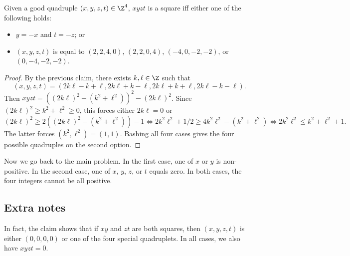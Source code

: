 \begin{claim}
Given a good quadruple $(x, y, z, t) \in \Z^4$, $xyzt$ is a square iff either one of the following holds:
\begin{itemize}
    \item   $y = -x$ and $t = -z$; or
    \item   $(x, y, z, t)$ is equal to $(2, 2, 4, 0)$, $(2, 2, 0, 4)$, $(-4, 0, -2, -2)$, or $(0, -4, -2, -2)$.
\end{itemize}
\end{claim}
\begin{proof}
By the previous claim, there exists $k, \ell \in \Z$ such that
\[ (x, y, z, t) = (2k \ell - k + \ell, 2k \ell + k - \ell, 2k \ell + k + \ell, 2k \ell - k - \ell). \]
Then $xyzt = ((2k \ell)^2 - (k^2 + \ell^2))^2 - (2k \ell)^2$.
Since $(2k \ell)^2 \geq k^2 + \ell^2 \geq 0$, this forces either $2 k \ell = 0$ or
\[ (2k \ell)^2 \geq 2((2k \ell)^2 - (k^2 + \ell^2)) - 1 \iff 2 k^2 \ell^2 + 1/2 \geq 4 k^2 \ell^2 - (k^2 + \ell^2) \iff 2 k^2 \ell^2 \leq k^2 + \ell^2 + 1. \]
The latter forces $(k^2, \ell^2) = (1, 1)$.
Bashing all four cases gives the four possible quadruples on the second option.
\end{proof}

Now we go back to the main problem.
In the first case, one of $x$ or $y$ is non-positive.
In the second case, one of $x$, $y$, $z$, or $t$ equals zero.
In both cases, the four integers cannot be all positive.



\subsection*{Extra notes}

In fact, the claim shows that if $xy$ and $zt$ are both squares, then $(x, y, z, t)$ is either $(0, 0, 0, 0)$ or one of the four special quadruplets.
In all cases, we also have $xyzt = 0$.